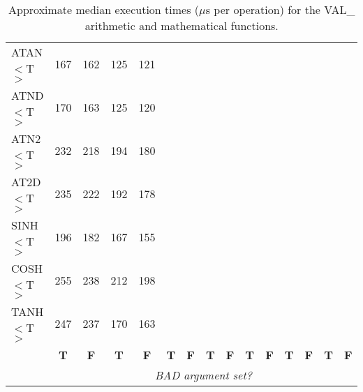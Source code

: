 \documentclass[11pt,nolof]{starlink}
\providecommand{\name}[1]{#1}
\begin{document}
\begin{table}[h]
\begin{center}
\begin{scriptsize}
\begin{tabular}{|l|r|r||r|r||r|r||r|r||r|r||r|r||r|r|}
ATAN$<$T$>$ &  167 &  162 &  125 &  121 &      &      &      &      &      &      &      &      &      &      \\
ATND$<$T$>$ &  170 &  163 &  125 &  120 &      &      &      &      &      &      &      &      &      &      \\
ATN2$<$T$>$ &  232 &  218 &  194 &  180 &      &      &      &      &      &      &      &      &      &      \\
AT2D$<$T$>$ &  235 &  222 &  192 &  178 &      &      &      &      &      &      &      &      &      &      \\
SINH$<$T$>$ &  196 &  182 &  167 &  155 &      &      &      &      &      &      &      &      &      &      \\
COSH$<$T$>$ &  255 &  238 &  212 &  198 &      &      &      &      &      &      &      &      &      &      \\
TANH$<$T$>$ &  247 &  237 &  170 &  163 &      &      &      &      &      &      &      &      &      &      \\
\hline
\multicolumn{1}{c}{} &
\multicolumn{1}{|c}{\textbf{T}} & \multicolumn{1}{|c||}{\textbf{F}} &
\multicolumn{1}{c}{\textbf{T}} & \multicolumn{1}{|c||}{\textbf{F}} &
\multicolumn{1}{c}{\textbf{T}} & \multicolumn{1}{|c||}{\textbf{F}} &
\multicolumn{1}{c}{\textbf{T}} & \multicolumn{1}{|c||}{\textbf{F}} &
\multicolumn{1}{c}{\textbf{T}} & \multicolumn{1}{|c||}{\textbf{F}} &
\multicolumn{1}{c}{\textbf{T}} & \multicolumn{1}{|c||}{\textbf{F}} &
\multicolumn{1}{c}{\textbf{T}} & \multicolumn{1}{|c|}{\textbf{F}}\\
\cline{2-15}
\multicolumn{1}{c}{} &
\multicolumn{14}{|c|}{\emph{BAD argument set?}}\\
\cline{2-15}
\end{tabular}
\end{scriptsize}
\caption{Approximate median execution times ($\mu$s per operation) for the
\name{VAL\_} arithmetic and mathematical functions.}
\label{table:valstats}
\end{center}
\end{table}

\newpage
\end{document}
